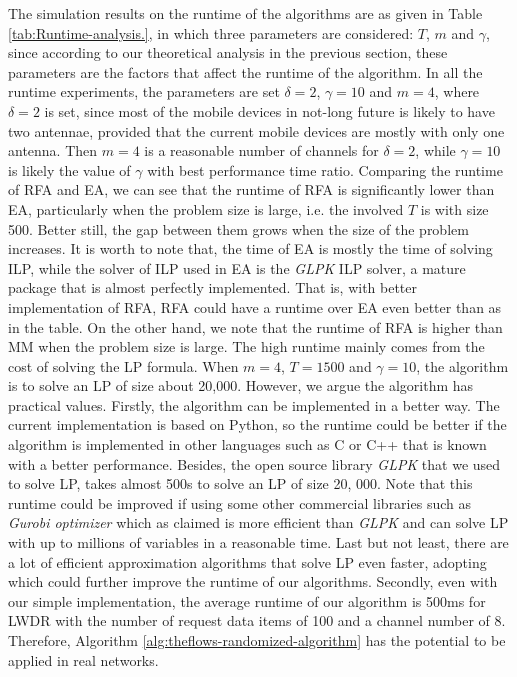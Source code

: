 \documentclass[11pt,english,onecolumn,draftcls]{IEEEtran}
\theoremstyle{plain}
\theoremstyle{plain}
\theoremstyle{plain}
\theoremstyle{plain}
\begin{document}
The simulation results on the runtime of the algorithms are as given
in Table \ref{tab:Runtime-analysis.}, in which three parameters are
considered: $T$, $m$ and $\gamma$, since according to our theoretical
analysis in the previous section, these parameters are the factors
that affect the runtime of the algorithm. In all the runtime experiments,
the parameters are set $\delta=2$, $\gamma=10$ and $m=4$, where
$\delta=2$ is set, since most of the mobile devices in not-long future
is likely to have two antennae, provided that the current mobile devices
are mostly with only one antenna. Then $m=4$ is a reasonable number
of channels for $\delta=2$, while $\gamma=10$ is likely the value
of $\gamma$ with best performance time ratio. Comparing the runtime
of RFA and EA, we can see that the runtime of RFA is significantly
lower than EA, particularly when the problem size is large, i.e. the
involved $T$ is with size 500. Better still, the gap between them
grows when the size of the problem increases. It is worth to note
that, the time of EA is mostly the time of solving ILP, while the
solver of ILP used in EA is the \emph{GLPK} ILP solver, a mature package
that is almost perfectly implemented. That is, with better implementation
of RFA, RFA could have a runtime over EA even better than as in the
table. On the other hand, we note that the runtime of RFA is higher
than MM when the problem size is large. The high runtime mainly comes
from the cost of solving the LP formula. When $m=4$, $T=1500$ and
$\gamma=10$, the algorithm is to solve an LP of size about 20,000.
However, we argue the algorithm has practical values. Firstly, the
algorithm can be implemented in a better way. The current implementation
is based on Python, so the runtime could be better if the algorithm
is implemented in other languages such as C or C++ that is known with
a better performance. Besides, the open source library \emph{GLPK}
that we used to solve LP, takes almost 500s to solve an LP of size
20, 000. Note that this runtime could be improved if using some other
commercial libraries such as \emph{Gurobi optimizer} which as claimed
is more efficient than \emph{GLPK} and can solve LP with up to millions
of variables in a reasonable time. Last but not least, there are a
lot of efficient approximation algorithms that solve LP even faster,
adopting which could further improve the runtime of our algorithms.
Secondly, even with our simple implementation, the average runtime
of our algorithm is 500ms for LWDR with the number of request data
items of 100 and a channel number of 8. Therefore, Algorithm \ref{alg:theflows-randomized-algorithm}
has the potential to be applied in real networks.
\end{document}
